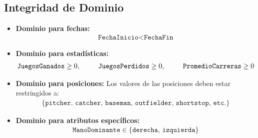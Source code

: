 \documentclass{report}
\begin{document}
    \subsection*{Integridad de Dominio}
    \begin{itemize}
        \item \textbf{Dominio para fechas:} 
        \begin{align*}
            \texttt{FechaInicio} < \texttt{FechaFin}
        \end{align*}

        \item \textbf{Dominio para estadísticas:} 
        \begin{align*}
            \texttt{JuegosGanados} \geq 0, \hspace*{0.9cm} \texttt{JuegosPerdidos} \geq 0, \hspace*{0.9cm} \texttt{PromedioCarreras} \geq 0
        \end{align*}

        \item \textbf{Dominio para posiciones:} Los valores de las posiciones deben estar restringidos a:
        \begin{align*}
            \{\texttt{pitcher, catcher, baseman, outfielder, shortstop, etc.}\}
        \end{align*}

        \item \textbf{Dominio para atributos específicos:} 
        \begin{align*}
            \texttt{ManoDominante} \in \{\texttt{derecha, izquierda}\}
        \end{align*}
    \end{itemize}
\end{document}
